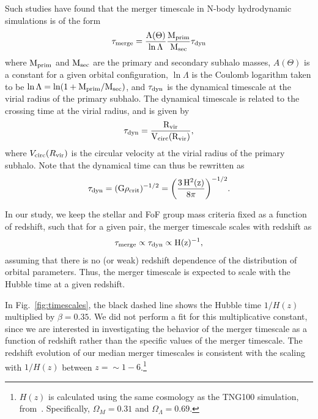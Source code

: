 \documentclass[twocolumn,linenumbers]{aastex631}
\begin{document}
        Such studies have found that the merger timescale in N-body hydrodynamic simulations is of the form
        \begin{equation}
            \rm \tau_{\rm merge} = \frac{A(\Theta)}{\ln \Lambda}\frac{\mprim}{\msec}\tau_{\rm dyn}
        \end{equation}
        where $\rm M_{prim}$ and $\rm M_{sec}$ are the primary and secondary subhalo masses, $A(\Theta)$ is a constant for a given orbital configuration, $\ln\Lambda$ is the Coulomb logarithm taken to be $\ln\Lambda = \ln(1+\rm M_{prim}/\rm M_{sec})$, and $\tau_{\rm dyn}$ is the dynamical timescale at the virial radius of the primary subhalo.
        The dynamical timescale is related to the crossing time at the virial radius, and is given by 
        \begin{equation}
            \rm \tau_{\rm dyn} = \frac{\Rvir}{V_{\rm circ}(\Rvir)},
        \end{equation}
        where $V_{\rm circ}(R_{\mathrm{vir}})$ is the circular velocity at the virial radius of the primary subhalo. 
        Note that the dynamical time can thus be rewritten as 
        \begin{equation}
            \rm \tau_{\rm dyn} = (G\rho_{crit})^{-1/2} = \bigg(\frac{3\,H^2(z)}{8\pi}\bigg)^{-1/2}.
        \end{equation}

        In our study, we keep the stellar and FoF group mass criteria fixed as a function of redshift, such that for a given pair, the merger timescale scales with redshift as
        \begin{equation}
            \rm \tau_{merge} \propto \tau_{dyn} \propto H(z)^{-1},
        \end{equation}
        assuming that there is no (or weak) redshift dependence of the distribution of orbital parameters.
        Thus, the merger timescale is expected to scale with the Hubble time at a given redshift. 
        
        In Fig.~\ref{fig:timescales}, the black dashed line shows the Hubble time $1/H(z)$ multiplied by $\beta=0.35$. 
        We did not perform a fit for this multiplicative constant, since we are interested in investigating the behavior of the merger timescale as a function of redshift rather than the specific values of the merger timescale. 
        The redshift evolution of our median merger timescales is consistent with the scaling with $1/H(z)$ between $z=\sim1-6$.\footnote{$H(z)$ is calculated using the same cosmology as the TNG100 simulation, from~\citet{Planck2015}. Specifically, $\Omega_M=0.31$ and $\Omega_{\Lambda}=0.69$.}
        
\end{document}

